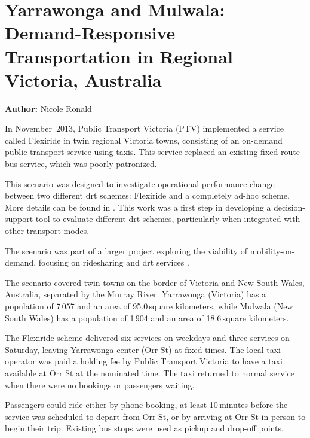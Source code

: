 \chapter{Yarrawonga and Mulwala: Demand-Responsive Transportation in Regional Victoria, Australia}
\label{ch:yarrawonga}
\hfill \textbf{Author:} Nicole Ronald


In November~2013, Public Transport Victoria (PTV) implemented a service called
Flexiride in twin regional Victoria towns, consisting of an on-demand public
transport service using taxis. This service replaced an existing fixed-route bus
service, which was poorly patronized.

This scenario was designed to investigate operational performance change  
 between two different \gls{drt} schemes: Flexiride and a
completely ad-hoc scheme. More details can be found in
\citep[][]{RonThoWin2015}. This work was a first step in developing a
decision-support tool to evaluate different \gls{drt} schemes, particularly when
integrated with other transport modes. 

The scenario was part of a larger project exploring the viability of
mobility-on-demand, focusing on ridesharing and \gls{drt} services \citep[][]{Ronald_iMoD_2014}.

The scenario covered twin towns on the border of Victoria and New South Wales,
Australia, separated by the Murray River. Yarrawonga (Victoria) has a population
of 7\,057 and an area of 95.0\,square kilometers, while Mulwala (New South Wales) has a
population of 1\,904 and an area of 18.6\,square kilometers. 

The Flexiride scheme delivered six services on weekdays and three services on
Saturday, leaving Yarrawonga center (Orr St) at fixed times. The local
taxi operator was paid a holding fee by Public Transport Victoria to have a taxi available at
Orr St at the nominated time. The taxi returned to normal service when there were no
bookings or passengers waiting.

Passengers could ride either by phone booking, at least 10\,minutes before
the service was scheduled to depart from Orr St, or by arriving at Orr St in
person to begin their trip. Existing bus stops were used as pickup and drop-off
points.

